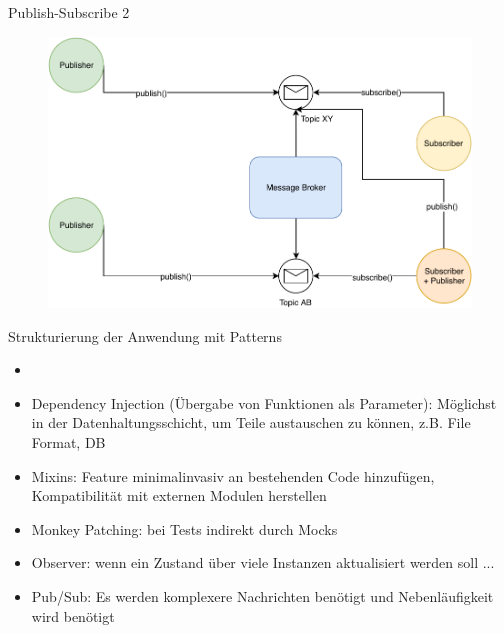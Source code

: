 \begin{frame}{Publish-Subscribe 2}
      \begin{figure}[!htb]
        \includegraphics[scale=0.67]{07-python3/img/pubsub}
    \end{figure}

\end{frame}


\begin{frame}{Strukturierung der Anwendung mit Patterns}
      \begin{itemize}
        \setlength{\itemindent}{1.5in}
        \item [\textbf{Einsatz der Patterns}]
    \end{itemize}

    \begin{itemize}
        \item Dependency Injection (Übergabe von Funktionen als Parameter): Möglichst in der Datenhaltungsschicht, um Teile austauschen zu können, z.B. File Format, DB
        \item Mixins: Feature minimalinvasiv an bestehenden Code hinzufügen, Kompatibilität mit externen Modulen herstellen
        \item Monkey Patching:  bei Tests indirekt durch Mocks
        \item Observer:  wenn ein Zustand über viele Instanzen aktualisiert werden soll ...
        \item Pub/Sub:  Es werden komplexere Nachrichten benötigt und Nebenläufigkeit  wird benötigt
    \end{itemize}

\end{frame}



